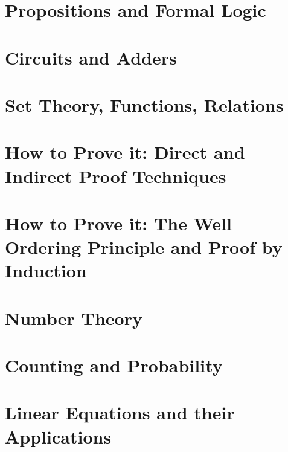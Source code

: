 



\frontmatter
\tableofcontents*

\mainmatter

\chapter{Propositions and Formal Logic}


\chapter{Circuits and Adders}


\chapter{Set Theory, Functions, Relations}


\chapter{How to Prove it: Direct and Indirect Proof Techniques}


\chapter{How to Prove it: The Well Ordering Principle and Proof by Induction}


\chapter{Number Theory}


\chapter{Counting and Probability}


\chapter{Linear Equations and their Applications}


\backmatter
{}

